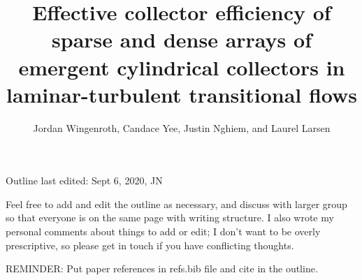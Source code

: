 \documentclass{scrreprt}
\author{Jordan Wingenroth, Candace Yee, Justin Nghiem, and Laurel Larsen}
\title{Effective collector efficiency of sparse and dense arrays of emergent cylindrical collectors in laminar-turbulent transitional flows}
\begin{document}
\maketitle

%

Outline last edited: Sept 6, 2020, JN

Feel free to add and edit the outline as necessary, and discuss with larger group so that everyone is on the same page with writing structure. I also wrote my personal comments about things to add or edit; I don't want to be overly prescriptive, so please get in touch if you have conflicting thoughts.

REMINDER: Put paper references in refs.bib file and cite in the outline.
\end{document}
